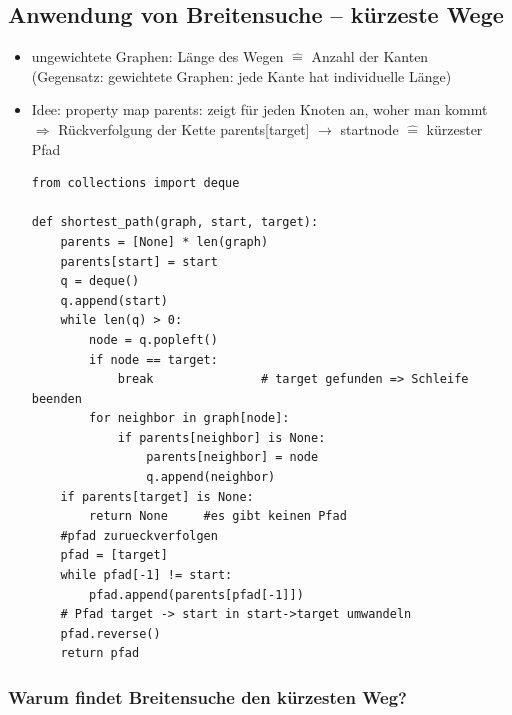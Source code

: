     \subsection*{Anwendung von Breitensuche – kürzeste Wege}
    \begin{itemize}
        \item ungewichtete Graphen: Länge des Wegen $\widehat{=}$ Anzahl der Kanten \\
        (Gegensatz: gewichtete Graphen: jede Kante hat individuelle Länge)
        \item Idee: property map parents: zeigt für jeden Knoten an, woher man kommt \\
        $\Rightarrow$ Rückverfolgung der Kette parents[target] $\rightarrow$ startnode $\widehat{=}$ kürzester Pfad
        \begin{verbatim}
from collections import deque

def shortest_path(graph, start, target):
    parents = [None] * len(graph)
    parents[start] = start
    q = deque()
    q.append(start)
    while len(q) > 0:
        node = q.popleft()
        if node == target:
            break               # target gefunden => Schleife beenden
        for neighbor in graph[node]:
            if parents[neighbor] is None:
                parents[neighbor] = node
                q.append(neighbor)
    if parents[target] is None:
        return None     #es gibt keinen Pfad
    #pfad zurueckverfolgen
    pfad = [target]
    while pfad[-1] != start:
        pfad.append(parents[pfad[-1]])
    # Pfad target -> start in start->target umwandeln
    pfad.reverse()
    return pfad
        \end{verbatim}
    \end{itemize}

    \subsubsection*{Warum findet Breitensuche den kürzesten Weg?}

